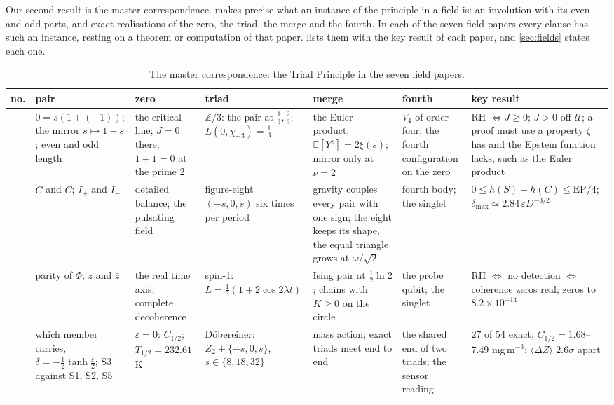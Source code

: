 \documentclass[11pt]{article}
\theoremstyle{definition}\newtheorem{definition}[theorem]{Definition}
\theoremstyle{remark}\newtheorem{remark}[theorem]{Remark}
\begin{document}
Our second result is the master correspondence.  makes precise what an instance of the principle in a field is: an involution with its even and odd parts, and exact realisations of the zero, the triad, the merge and the fourth. In each of the seven field papers every clause has such an instance, resting on a theorem or computation of that paper.  lists them with the key result of each paper, and \cref{sec:fields} states each one.

\begin{table}[!htbp]\centering\scriptsize\setlength{\tabcolsep}{2.5pt}
\caption{The master correspondence: the Triad Principle in the seven field papers.}\label{tab:master}
\begin{tabular}{@{}>{\raggedright\arraybackslash}p{0.45cm}>{\raggedright\arraybackslash}p{2.3cm}>{\raggedright\arraybackslash}p{2.1cm}>{\raggedright\arraybackslash}p{2.3cm}>{\raggedright\arraybackslash}p{2.3cm}>{\raggedright\arraybackslash}p{2.1cm}>{\raggedright\arraybackslash}p{3.2cm}@{}}\toprule
no. & pair & zero & triad & merge & fourth & key result\\\midrule
01 & $0=s(1+(-1))$; the mirror $s\mapsto1-s$; even and odd length & the critical line; $J=0$ there; $1+1=0$ at the prime $2$ & $\mathbb Z/3$: the pair at $\frac13,\frac23$; $L(0,\chi_{-3})=\frac13$ & the Euler product; $\mathbb E[Y^s]=2\xi(s)$; mirror only at $\nu=2$ & $V_4$ of order four; the fourth configuration on the zero & RH $\iff J\ge0$; $J>0$ off $\mathcal U$; a proof must use a property $\zeta$ has and the Epstein function lacks, such as the Euler product\\[2pt]
02 & $C$ and $\tilde C$; $I_+$ and $I_-$ & detailed balance; the pulsating field & figure-eight $(-s,0,s)$ six times per period & gravity couples every pair with one sign; the eight keeps its shape, the equal triangle grows at $\omega/\sqrt2$ & fourth body; the singlet & $0\le h(S)-h(C)\le\mathrm{EP}/4$; $\delta_{\max}\simeq2.84\,\varepsilon D^{-3/2}$\\[2pt]
03 & parity of $\Phi$; $z$ and $\bar z$ & the real time axis; complete decoherence & spin-1: $L=\frac13(1+2\cos2\lambda t)$ & Ising pair at $\frac12\ln2$; chains with $K\ge0$ on the circle & the probe qubit; the singlet & RH $\iff$ no detection $\iff$ coherence zeros real; zeros to $8.2\times10^{-14}$\\[2pt]
04 & which member carries, $\delta=-\frac12\tanh\frac\varepsilon2$; S3 against S1, S2, S5 & $\varepsilon=0$: $C_{1/2}$; $T_{1/2}=232.61$ K & D\"obereiner: $Z_2+\{-s,0,s\}$, $s\in\{8,18,32\}$ & mass action; exact triads meet end to end & the shared end of two triads; the sensor reading & $27$ of $54$ exact; $C_{1/2}=1.68$--$7.49$ mg\,m$^{-3}$; $\langle\Delta Z\rangle$ $2.6\sigma$ apart\\[2pt]

\end{tabular}
\end{table}
\end{document}
